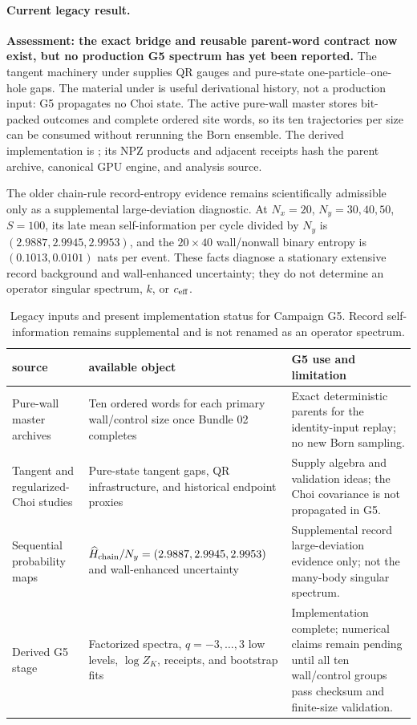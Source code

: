 \documentclass[aps,prx,twocolumn,floatfix,nofootinbib,superscriptaddress,longbibliography]{revtex4-2}
\newcommand{\campaignTableSetup}{%
  \footnotesize
  \setlength{\tabcolsep}{4pt}%
  \renewcommand{\arraystretch}{1.12}%
}
\begin{document}
\paragraph*{Current legacy result.}
\textbf{Assessment: the exact bridge and reusable parent-word contract now exist, but no
production G5 spectrum has yet been reported.}  The tangent machinery under
 supplies QR gauges and pure-state
one-particle--one-hole gaps.  The material under
 is useful derivational
history, not a production input: G5 propagates no Choi state.  The active pure-wall master
stores bit-packed outcomes and complete ordered site words, so its ten trajectories per
size can be consumed without rerunning the Born ensemble.  The derived implementation is
; its NPZ products and
adjacent receipts hash the parent archive, canonical GPU engine, and analysis source.

The older chain-rule record-entropy evidence remains scientifically admissible only as a
supplemental large-deviation diagnostic.  At $N_x=20$, $N_y=30,40,50$, $S=100$, its late
mean self-information per cycle divided by $N_y$ is
$(2.9887,2.9945,2.9953)$, and the $20\times40$ wall/nonwall binary entropy is
$(0.1013,0.0101)$ nats per event.  These facts diagnose a stationary extensive record
background and wall-enhanced uncertainty; they do not determine an operator singular
spectrum, $k$, or $c_{\rm eff}$.

\begin{table}[t]
\campaignTableSetup
\caption{Legacy inputs and present implementation status for Campaign G5.  Record
self-information remains supplemental and is not renamed as an operator spectrum.}
\label{tab:G5-legacy}
\begin{tabularx}{\textwidth}{@{}L{0.70}L{0.95}L{1.35}@{}}
\toprule
source & available object & G5 use and limitation \\
\midrule
Pure-wall master archives
& Ten ordered words for each primary wall/control size once Bundle 02 completes
& Exact deterministic parents for the identity-input replay; no new Born sampling. \\
Tangent and regularized-Choi studies
& Pure-state tangent gaps, QR infrastructure, and historical endpoint proxies
& Supply algebra and validation ideas; the Choi covariance is not propagated in G5. \\
Sequential probability maps
& $\widehat H_{\rm chain}/N_y=(2.9887,2.9945,2.9953)$ and wall-enhanced uncertainty
& Supplemental record large-deviation evidence only; not the many-body singular spectrum. \\
Derived G5 stage
& Factorized spectra, $q=-3,\ldots,3$ low levels, $\log Z_K$, receipts, and bootstrap fits
& Implementation complete; numerical claims remain pending until all ten wall/control
groups pass checksum and finite-size validation. \\
\bottomrule
\end{tabularx}
\end{table}
\end{document}

